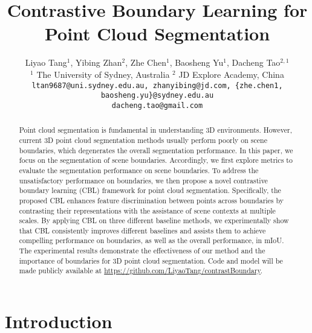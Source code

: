 \documentclass[10pt,twocolumn,letterpaper]{article}
\begin{document}
\title{Contrastive Boundary Learning for Point Cloud Segmentation}

\author{
Liyao Tang$^1$, Yibing Zhan$^2$, Zhe Chen$^{1}$, Baosheng Yu$^1$, Dacheng Tao$^{2,1}$ \\
$^1$ The University of Sydney, Australia $^2$ JD Explore Academy, China \\
{\tt\small ltan9687@uni.sydney.edu.au, zhanyibing@jd.com, \{zhe.chen1, baosheng.yu\}@sydney.edu.au} \\
{\tt\small dacheng.tao@gmail.com}
}

\maketitle



\begin{abstract}
Point cloud segmentation is fundamental in understanding 3D environments. However, current 3D point cloud segmentation methods usually perform poorly on scene boundaries, which degenerates the overall segmentation performance. In this paper, we focus on the segmentation of scene boundaries. Accordingly, we first explore metrics to evaluate the segmentation performance on scene boundaries. To address the unsatisfactory performance on boundaries, we then propose a novel contrastive boundary learning (CBL) framework for point cloud segmentation. Specifically, the proposed CBL enhances feature discrimination between points across boundaries by contrasting their representations with the assistance of scene contexts at multiple scales.
By applying CBL on three different baseline methods, we experimentally show that CBL consistently improves different baselines and assists them to achieve compelling performance on boundaries, as well as the overall performance, \eg in mIoU.
The experimental results demonstrate the effectiveness of our method and the importance of boundaries for 3D point cloud segmentation.
Code and model will be made publicly available at \href{https://github.com/LiyaoTang/contrastBoundary}{https://github.com/LiyaoTang/contrastBoundary}.
\end{abstract}



\section{Introduction}
\label{sec:intro}
\end{document}
